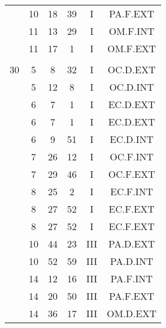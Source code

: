 \documentclass[12pt, a4paper]{article}
\begin{document}
\begin{multicols}{3}
{\begin{tabular}{c c c c c c}
	 	 	 	 & 10 & 18 & 39 & I & PA.F.EXT\\%
	 	 	 	 & 11 & 13 & 29 & I & OM.F.INT\\%
	 	 	 	 & 11 & 17 & 1 & I & OM.F.EXT\\%
	 	 	 	 & & & & & \\%
	 	 	 	30 & 5 & 8 & 32 & I & OC.D.EXT\\%
	 	 	 	 & 5 & 12 & 8 & I & OC.D.INT\\%
	 	 	 	 & 6 & 7 & 1 & I & EC.D.EXT\\%
	 	 	 	 & 6 & 7 & 1 & I & EC.D.EXT\\%
	 	 	 	 & 6 & 9 & 51 & I & EC.D.INT\\%
	 	 	 	 & 7 & 26 & 12 & I & OC.F.INT\\%
	 	 	 	 & 7 & 29 & 46 & I & OC.F.EXT\\%
	 	 	 	 & 8 & 25 & 2 & I & EC.F.INT\\%
	 	 	 	 & 8 & 27 & 52 & I & EC.F.EXT\\%
	 	 	 	 & 8 & 27 & 52 & I & EC.F.EXT\\%
	 	 	 	 & 10 & 44 & 23 & III & PA.D.EXT\\%
	 	 	 	 & 10 & 52 & 59 & III & PA.D.INT\\%
	 	 	 	 & 14 & 12 & 16 & III & PA.F.INT\\%
	 	 	 	 & 14 & 20 & 50 & III & PA.F.EXT\\%
	 	 	 	 & 14 & 36 & 17 & III & OM.D.EXT\\%
	 	 \end{tabular}
 	}
\end{multicols}
\end{document}
